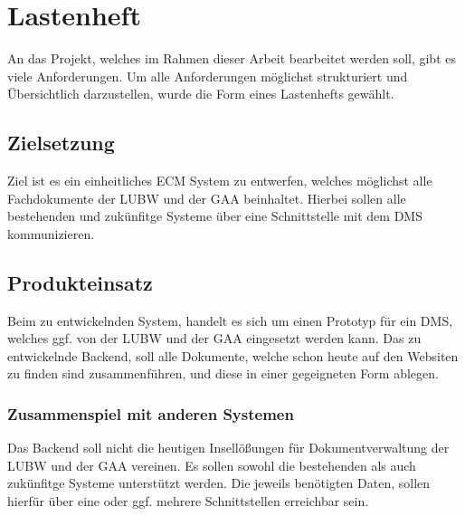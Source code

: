 \section{Lastenheft}
An das Projekt, welches im Rahmen dieser Arbeit bearbeitet werden soll, gibt es viele Anforderungen. Um alle Anforderungen m\"oglichst strukturiert und \"Ubersichtlich darzustellen, wurde die Form eines Lastenhefts gew\"ahlt.

\subsection{Zielsetzung}
Ziel ist es ein einheitliches \ac{ECM} System zu entwerfen, welches m\"oglichst alle Fachdokumente der \ac{LUBW} und der \ac{GAA} beinhaltet.
Hierbei sollen alle bestehenden und zuk\"unfitge Systeme \"uber eine Schnittstelle mit dem \ac{DMS} kommunizieren.

\subsection{Produkteinsatz}
Beim zu entwickelnden System, handelt es sich um einen Prototyp f\"ur ein \ac{DMS}, welches ggf. von der \ac{LUBW} und der \ac{GAA} eingesetzt werden kann. Das zu entwickelnde Backend, soll alle Dokumente, welche schon heute auf den Websiten zu finden sind zusammenf\"uhren, und diese in einer gegeigneten Form ablegen.

\subsubsection{Zusammenspiel mit anderen Systemen}
Das Backend soll nicht die heutigen Insell\"o\ss{}ungen f\"ur Dokumentverwaltung der \ac{LUBW} und der \ac{GAA} vereinen. Es sollen sowohl die bestehenden als auch zuk\"unfitge Systeme unterst\"utzt werden. Die jeweils ben\"otigten Daten, sollen hierf\"ur \"uber eine oder ggf. mehrere Schnittstellen erreichbar sein.

